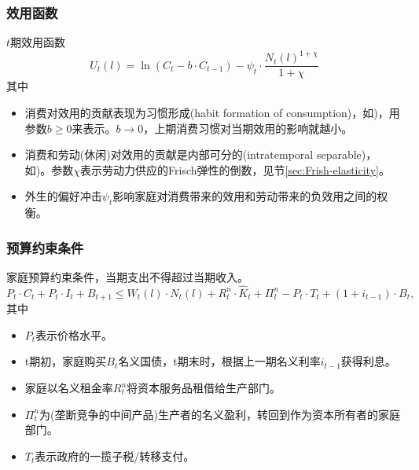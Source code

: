 \subsubsection{效用函数}
$t$期效用函数
\begin{equation}
\label{eq:MS-hh-utility}
U_t(l) = \ln \left(C_t - b \cdot C_{t-1} \right)- \psi_{t} \cdot \frac{N_{t}(l)^{1+\chi}}{1+\chi}
\end{equation}
其中
\begin{itemize}
\item 消费对效用的贡献表现为习惯形成(habit formation of consumption)，如\cite{Fuhrer:2000ez, Bouakez:2005da})，用参数$b \ge 0$来表示。$b \rightarrow 0$，上期消费习惯对当期效用的影响就越小。
\item 消费和劳动(休闲)对效用的贡献是内部可分的(intratemporal separable)，如\cite{Christiano:2005ib})。参数$\chi$表示劳动力供应的Frisch弹性的倒数，见节\ref{sec:Frish-elasticity}。
\item 外生的偏好冲击$\psi_t$影响家庭对消费带来的效用和劳动带来的负效用之间的权衡。
\end{itemize}

\subsubsection{预算约束条件}
家庭预算约束条件，当期支出不得超过当期收入。
\begin{equation}
\label{sec:MC-hh-budget-constraint}
P_t \cdot C_t + P_t \cdot I_t + B_{t+1} \le W_t(l) \cdot N_t(l) + R^n_t \cdot \hat{K}_t + \Pi^n_t - P_t \cdot T_t + \left(1+i_{t-1}\right) \cdot B_t,
\end{equation}
其中
\begin{itemize}
\item $P_t$表示价格水平。
\item t期初，家庭购买$B_t$名义国债，t期末时，根据上一期名义利率$i_{t-1}$获得利息。
\item 家庭以名义租金率$R^n_t$将资本服务品租借给生产部门。
\item $\Pi^n_t$为(垄断竞争的中间产品)生产者的名义盈利，转回到作为资本所有者的家庭部门。
\item $T_t$表示政府的一揽子税/转移支付。
\end{itemize}

